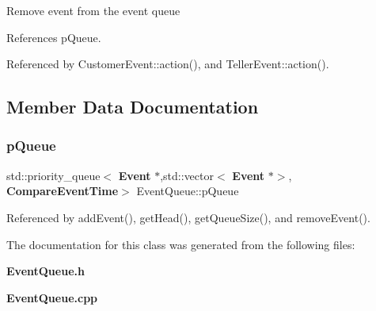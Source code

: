 Remove event from the event queue 

References p\+Queue.



Referenced by Customer\+Event\+::action(), and Teller\+Event\+::action().



\subsection{Member Data Documentation}
\mbox{\label{classEventQueue_a89681bfba67cfbdb7678e19b9a88a3e6}} 
\subsubsection{p\+Queue}
{\footnotesize\ttfamily std\+::priority\+\_\+queue$<$\textbf{ Event} $\ast$,std\+::vector$<$\textbf{ Event} $\ast$$>$,\textbf{ Compare\+Event\+Time}$>$ Event\+Queue\+::p\+Queue}



Referenced by add\+Event(), get\+Head(), get\+Queue\+Size(), and remove\+Event().



The documentation for this class was generated from the following files\+:\begin{DoxyCompactItemize}
\item 
\textbf{ Event\+Queue.\+h}\item 
\textbf{ Event\+Queue.\+cpp}\end{DoxyCompactItemize}
